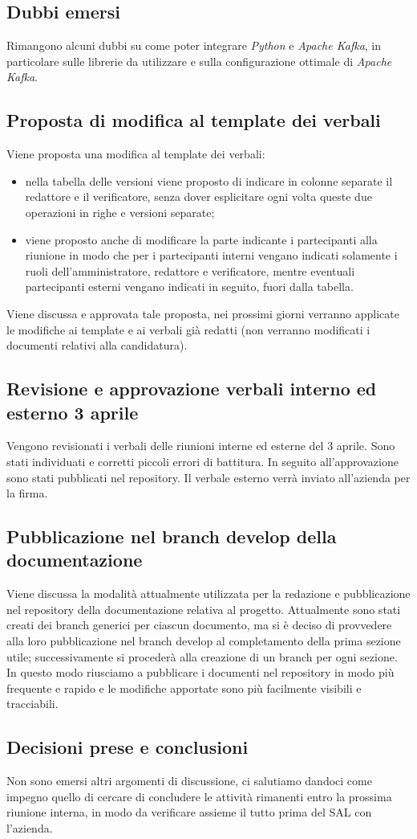 \documentclass[italian,12pt]{article}
\begin{document}
\subsection{Dubbi emersi}
Rimangono alcuni dubbi su come poter integrare \textit{Python} e \textit{Apache Kafka}, in particolare sulle librerie da utilizzare e sulla configurazione ottimale di \textit{Apache Kafka}.

\subsection{Proposta di modifica al template dei verbali}
Viene proposta una modifica al template dei verbali:
\begin{itemize}
	\item nella tabella delle versioni viene proposto di indicare in colonne separate il redattore e il verificatore, senza dover esplicitare ogni volta queste due operazioni in righe e versioni separate;
	\item viene proposto anche di modificare la parte indicante i partecipanti alla riunione in modo che per i partecipanti interni vengano indicati solamente i ruoli dell'amministratore, redattore e verificatore, mentre eventuali partecipanti esterni vengano indicati in seguito, fuori dalla tabella.
\end{itemize}
Viene discussa e approvata tale proposta, nei prossimi giorni verranno applicate le modifiche ai template e ai verbali già redatti (non verranno modificati i documenti relativi alla candidatura).

\subsection{Revisione e approvazione verbali interno ed esterno 3 aprile}
Vengono revisionati i verbali delle riunioni interne ed esterne del 3 aprile. Sono stati individuati e corretti piccoli errori di battitura. In seguito all'approvazione sono stati pubblicati nel repository. Il verbale esterno verrà inviato all'azienda per la firma.

\subsection{Pubblicazione nel branch develop della documentazione}
Viene discussa la modalità attualmente utilizzata per la redazione e pubblicazione nel repository della documentazione relativa al progetto. Attualmente sono stati creati dei branch generici per ciascun documento, ma si è deciso di provvedere alla loro pubblicazione nel branch develop al completamento della prima sezione utile; successivamente si procederà alla creazione di un branch per ogni sezione. In questo modo riusciamo a pubblicare i documenti nel repository in modo più frequente e rapido e le modifiche apportate sono più facilmente visibili e tracciabili.

\subsection{Decisioni prese e conclusioni}
Non sono emersi altri argomenti di discussione, ci salutiamo dandoci come impegno quello di cercare di concludere le attività rimanenti entro la prossima riunione interna, in modo da verificare assieme il tutto prima del SAL con l'azienda.
\end{document}
